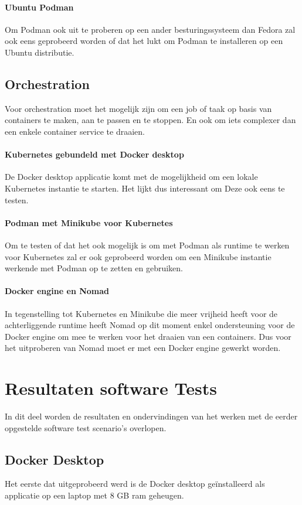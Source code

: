 \begin{itemize}
\paragraph{Ubuntu Podman}
Om Podman ook uit te proberen op een ander besturingssysteem dan Fedora zal ook eens geprobeerd worden of dat het lukt om Podman te installeren op een Ubuntu distributie.

\subsection{Orchestration}
Voor orchestration moet het mogelijk zijn om een job of taak op basis van containers te maken, aan te passen en te stoppen. En ook om iets complexer dan een enkele container service te draaien.

\paragraph{Kubernetes gebundeld met Docker desktop}
De Docker desktop applicatie komt met de mogelijkheid om een lokale Kubernetes instantie te starten. Het lijkt dus interessant om Deze ook eens te testen.

\paragraph{Podman met Minikube voor Kubernetes}
Om te testen of dat het ook mogelijk is om met Podman als runtime te werken voor Kubernetes zal er ook geprobeerd worden om een Minikube instantie werkende met Podman op te zetten en gebruiken.

\paragraph{Docker engine en Nomad}
In tegenstelling tot Kubernetes en Minikube die meer vrijheid heeft voor de achterliggende runtime heeft Nomad op dit moment enkel ondersteuning voor de Docker engine om mee te werken voor het draaien van een containers. Dus voor het uitproberen van Nomad moet er met een Docker engine gewerkt worden.

\section{Resultaten software Tests}
In dit deel worden de resultaten en ondervindingen van het werken met de eerder opgestelde software test scenario’s overlopen. 

\subsection{Docker Desktop}
Het eerste dat uitgeprobeerd werd is de Docker desktop geïnstalleerd als applicatie op een laptop met 8 GB ram geheugen.


\end{itemize}

